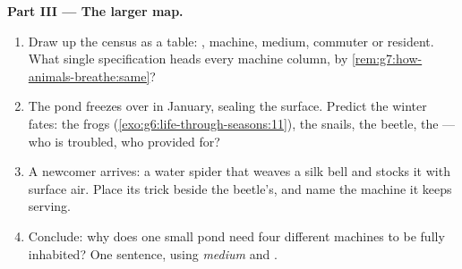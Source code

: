 \begin{problem}
\medskip\noindent\textbf{Part III --- The larger map.}
\begin{enumerate}[resume]
  \item Draw up the census as a table: , machine,
        medium, commuter or resident. What single
        specification heads every machine column, by
        \cref{rem:g7:how-animals-breathe:same}?
  \item The pond freezes over in January, sealing the
        surface. Predict the winter fates: the frogs
        (\cref{exo:g6:life-through-seasons:11}), the
        snails, the beetle, the  --- who is troubled,
        who provided for?
  \item A newcomer arrives: a water spider that weaves a
        silk bell and stocks it with surface air. Place
        its trick beside the beetle's, and name the
        machine it keeps serving.
  \item Conclude: why does one small pond need four
        different  machines to be fully
        inhabited? One sentence, using \emph{medium} and
        \emph{}.
\end{enumerate}
\end{problem}

